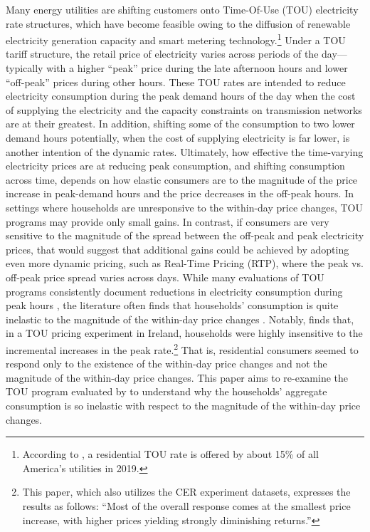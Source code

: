 Many energy utilities are shifting customers onto Time-Of-Use (TOU) electricity rate structures, which have become feasible owing to the diffusion of renewable electricity generation capacity and smart metering technology.\footnote{According to \cite{A-Survey-of-Residential-TOU-Rates_FHS_2019}, a residential TOU rate is offered by about 15\% of all America's utilities in 2019.} Under a TOU tariff structure, the retail price of electricity varies across periods of the day---typically with a higher ``peak'' price during the late afternoon hours and lower ``off-peak'' prices during other hours. These TOU rates are intended to reduce electricity consumption during the peak demand hours of the day when the cost of supplying the electricity and the capacity constraints on transmission networks are at their greatest. In addition, shifting some of the consumption to two lower demand hours potentially, when the cost of supplying electricity is far lower, is another intention of the dynamic rates. Ultimately, how effective the time-varying electricity prices are at reducing peak consumption, and shifting consumption across time, depends on how elastic consumers are to the magnitude of the price increase in peak-demand hours and the price decreases in the off-peak hours. In settings where households are unresponsive to the within-day price changes, TOU programs may provide only small gains. In contrast, if consumers are very sensitive to the magnitude of the spread between the off-peak and peak electricity prices, that would suggest that additional gains could be achieved by adopting even more dynamic pricing, such as Real-Time Pricing (RTP), where the peak vs. off-peak price spread varies across days. While many evaluations of TOU programs consistently document reductions in electricity consumption during peak hours \citep{Quantifying-Customer-Response-to-Dynamic-Pricing_Faruqui-and-George_2005, Dynamic-Pricing-of-Electricity-in-the-Mid-Atlantic-Region_Econometric-Results-from-the-Baltimore-Gas-and-Electric-Company-Experiment_Faruqui-et-al_2011, Dynamic-Pricing-of-Electricity-for-Residential-Customers_The-Evidence-from-Michigan_Faruqui-et-al_2013}, the literature often finds that households' consumption is quite inelastic to the magnitude of the within-day price changes \citep{Rethinking-Real-Time-Electricity-Pricing_Allcott_2011, Knowledge-is-Less-Power_Jessoe-and-Rapson_2014}. Notably, \cite{Peaking-Interest:How-Awareness-Drives-the-Effectiveness-of-Time-of-Use-Electricity-Pricing_Prest_2020} finds that, in a TOU pricing experiment in Ireland, households were highly insensitive to the incremental increases in the peak rate.\footnote{This paper, which also utilizes the CER experiment datasets, expresses the results as follows: ``Most of the overall response comes at the smallest price increase, with higher prices yielding strongly diminishing returns.''} That is, residential consumers seemed to respond only to the existence of the within-day price changes and not the magnitude of the within-day price changes. This paper aims to re-examine the TOU program evaluated by \cite{Peaking-Interest:How-Awareness-Drives-the-Effectiveness-of-Time-of-Use-Electricity-Pricing_Prest_2020} to understand why the households' aggregate consumption is so inelastic with respect to the magnitude of the within-day price changes. 

